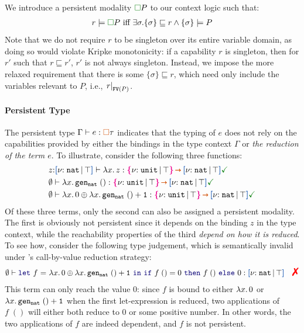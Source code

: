 \begin{definition} We introduce a persistent
  modality $\chpers P$ to our context logic such that:
  \vspace{-0.2em}
  \begin{align*}
    r \models \chpers P \text{ iff } \exists \sigma. \{\sigma\} \sqsubseteq r \land \{\sigma\} \models P
  \end{align*}\noindent
  Note that we do not require $r$ to be singleton over its entire
  variable domain, as doing so would violate Kripke monotonicity: if a
  capability $r$ is singleton, then for $r'$ such that
  $r \sqsubseteq r'$, $r'$ is not always singleton. Instead, we impose
  the more relaxed requirement that there is some
  $\{\sigma\} \sqsubseteq r$, which need only include the variables
  relevant to $P$, i.e., $\left.{r}\right|_{{\tt FV}(P)}$.
\end{definition}

\paragraph{Persistent Type} The persistent type
$\Gamma \vdash e : \ctpers \tau$ indicates that the typing of $e$ does
not rely on the capabilities provided by either the bindings in the
type context $\Gamma$ or \emph{the reduction of the term $e$}. To
illustrate, consider the following three functions:
\vspace{-0.2em}
\begin{align*}
  &z{:}\urt{\Nat}{\top} \vdash \zzlam{x}{\, z} : \ort{\Unit}{\top}
    \ctsarr \urt{\Nat}{\top} \judgok \\
  &\emptyset \vdash \zzlam{x}{\, \Code{gen_{nat} \;()}} : \ort{\Unit}{\top}
    \ctsarr \urt{\Nat}{\top}  \judgok \\
  &\emptyset \vdash \zzlam{x}{\, 0} \oplus
    \zzlam{x}{\, \Code{gen_{nat} \;() + 1}} : \ort{\Unit}{\top} \ctsarr
    \urt{\Nat}{\top}  \judgok
\end{align*}\noindent
Of these three terms, only the second can also be assigned a
persistent modality. The first is obviously not persistent since it
depends on the binding $z$ in the type context, while the reachability
properties of the third \emph{depend on how it is reduced}. To see
how, consider the following type judgement, which is semantically
invalid under \langNDname{}'s call-by-value reduction strategy:
\vspace{-0.2em}
\begin{align*}
  \emptyset \vdash \zlet{f}{\zzlam{x}{\, 0} \oplus
  \zzlam{x}{\, \Code{gen_{nat} \;() + 1}}}{\zif{f\;() = 0}{f\;()}{0}} : \urt{\Nat}{\top} \quad \judgfail
\end{align*}\noindent
This term can only reach the value $0$: since $f$ is bound to either
$\lambda {x}.{\, 0}$ or $\lambda {x}.{\, {\tt gen_{nat} \;() + 1}}$ when the
first let-expression is reduced, two applications of $f\;()$ will
either both reduce to $0$ or some positive number. In other words, the
two applications of $f$ are indeed dependent, and $f$ is not
persistent.


